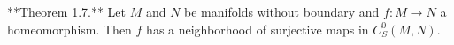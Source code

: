 **Theorem 1.7.** Let $M$ and $N$ be manifolds without boundary and $f: M \to N$ a homeomorphism. Then $f$ has a neighborhood of surjective maps in $C^0_S(M,N)$.
